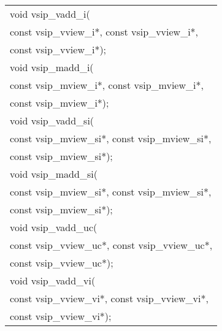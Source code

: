 {\begin{tabular}[H]{l}
void vsip\_vadd\_i(\\*\hspace{1cm}const vsip\_vview\_i*, const vsip\_vview\_i*,\\*\hspace{1cm}const vsip\_vview\_i*);\\
void vsip\_madd\_i(\\*\hspace{1cm}const vsip\_mview\_i*, const vsip\_mview\_i*,\\*\hspace{1cm}const vsip\_mview\_i*);\\
void vsip\_vadd\_si(\\*\hspace{1cm}const vsip\_mview\_si*, const vsip\_mview\_si*,\\*\hspace{1cm}const vsip\_mview\_si*);\\
void vsip\_madd\_si(\\*\hspace{1cm}const vsip\_mview\_si*, const vsip\_mview\_si*,\\*\hspace{1cm}const vsip\_mview\_si*);\\
void vsip\_vadd\_uc(\\*\hspace{1cm}const vsip\_vview\_uc*, const vsip\_vview\_uc*,\\*\hspace{1cm}const vsip\_vview\_uc*);\\
void vsip\_vadd\_vi(\\*\hspace{1cm}const vsip\_vview\_vi*, const vsip\_vview\_vi*,\\*\hspace{1cm}const vsip\_vview\_vi*);\\
\end{tabular}
}
%
\clearpage

